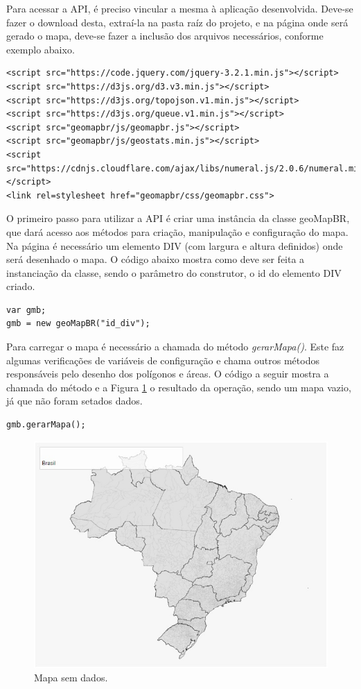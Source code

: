 \documentclass[12pt]{article}
\begin{document}
Para acessar a API, é preciso vincular a mesma à aplicação desenvolvida. Deve-se fazer o download desta, extraí-la na pasta raíz do projeto, e na página onde será gerado o mapa, deve-se fazer a inclusão dos arquivos necessários, conforme exemplo abaixo.

\begin{lstlisting}
<script src="https://code.jquery.com/jquery-3.2.1.min.js"></script>       
<script src="https://d3js.org/d3.v3.min.js"></script>
<script src="https://d3js.org/topojson.v1.min.js"></script>
<script src="https://d3js.org/queue.v1.min.js"></script>
<script src="geomapbr/js/geomapbr.js"></script>
<script src="geomapbr/js/geostats.min.js"></script>
<script src="https://cdnjs.cloudflare.com/ajax/libs/numeral.js/2.0.6/numeral.min.js"></script>
<link rel=stylesheet href="geomapbr/css/geomapbr.css">
\end{lstlisting}

O primeiro passo para utilizar a API é criar uma instância da classe geoMapBR, que dará acesso aos métodos para criação, manipulação e configuração do mapa. Na página é necessário um elemento DIV (com largura e altura definidos) onde será desenhado o mapa. O código abaixo mostra como deve ser feita a instanciação da classe, sendo o parâmetro do construtor, o id do elemento DIV criado.

\begin{lstlisting}
var gmb;
gmb = new geoMapBR("id_div");
\end{lstlisting}

Para carregar o mapa é necessário a chamada do método \textit{gerarMapa()}. Este faz algumas verificações de variáveis de configuração e chama outros métodos responsáveis pelo desenho dos polígonos e áreas. O código a seguir mostra a chamada do método e a Figura \ref{mapaVazio} o resultado da operação, sendo um mapa vazio, já que não foram setados dados.

\begin{lstlisting}
gmb.gerarMapa();
\end{lstlisting}

\begin{figure}[h]
\centering
\includegraphics[scale=0.65]{mapa-branco.jpg}
\caption{Mapa sem dados.}
\label{mapaVazio}
\end{figure}
\end{document}

